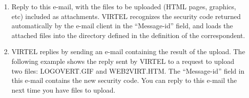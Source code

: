 \documentclass[letterpaper,10pt,english]{sphinxmanual}
\begin{document}
\begin{sphinxVerbatim}[commandchars=\\\{\}]
      
 
  
 
     
 
        
\end{sphinxVerbatim}

\begin{enumerate}
\def\theenumi{\arabic{enumi}}
\def\labelenumi{\theenumi .}
\makeatletter\def\p@enumii{\p@enumi \theenumi .}\makeatother
\setcounter{enumi}{1}
\item {} 
Reply to this e-mail, with the files to be uploaded (HTML pages, graphics, etc) included as attachments. VIRTEL recognizes the security code returned automatically by the e-mail client in the “Message-id” field, and loads the attached files into the directory defined in the definition of the correspondent.

\item {} 
VIRTEL replies by sending an e-mail containing the result of the upload. The following example shows the reply sent by VIRTEL to a request to upload two files: LOGOVERT.GIF and WEB2VIRT.HTM. The “Message-id” field in this e-mail contains the new security code. You can reply to this e-mail the next time you have files to upload.

\end{enumerate}
\end{document}
